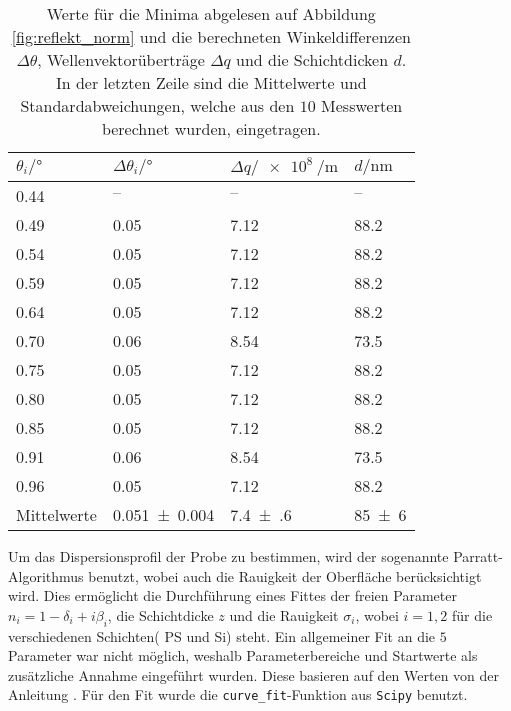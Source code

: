 \begin{table}
    \centering
    \begin{tabular}{@{}llll@{}}
    \toprule
     $\theta_i/ \si{\degree}$&$\Delta \theta_i / \si{\degree}$&$\Delta q / \SI{e8}{\per\metre} $&$d / \si{\nano\metre} $  \\ \midrule
     \num{0.44} &   $– $           &$– $   & $– $  \\
     \num{0.49} &\num{0.05 }   &\num{7.12}       & \num{88.2}  \\
     \num{0.54} &\num{0.05  }   &\num{7.12}      & \num{88.2} \\
     \num{0.59} &\num{0.05  }   &\num{7.12}      & \num{88.2} \\
     \num{0.64} &\num{0.05  }   &\num{7.12}      & \num{88.2} \\
     \num{0.70} &\num{0.06  }   &\num{8.54}      & \num{73.5} \\
     \num{0.75} &\num{0.05  }   &\num{7.12}      & \num{88.2} \\
     \num{0.80} &\num{0.05  }   &\num{7.12}      & \num{88.2} \\
     \num{0.85} &\num{0.05  }   &\num{7.12}      & \num{88.2} \\
     \num{0.91} &\num{0.06  }   &\num{8.54}      & \num{73.5} \\
     \num{0.96} &\num{0.05  }   &\num{7.12}      & \num{88.2} \\ \midrule
      Mittelwerte    &\num{0.051(4)} &\num{7.4(6)}  & \num{85(6)} \\ \bottomrule
    \end{tabular}
    \caption{Werte für die Minima abgelesen auf Abbildung \ref{fig:reflekt_norm} und die berechneten Winkeldifferenzen $\Delta \theta$, Wellenvektorüberträge $\Delta q$ und die Schichtdicken $d$. In der letzten Zeile sind die Mittelwerte und Standardabweichungen, welche aus den $10$ Messwerten berechnet wurden, eingetragen.}
    \label{tab:minima}
\end{table} 
Um das Dispersionsprofil der Probe zu bestimmen, wird der sogenannte Parratt-Algorithmus benutzt, wobei auch die Rauigkeit der Oberfläche berücksichtigt wird. 
Dies ermöglicht die Durchführung eines Fittes der freien Parameter $n_i = 1 -\delta_i +i\beta_i $, die Schichtdicke $z$ und die Rauigkeit $\sigma_i$, wobei $i = 1,2$ für die verschiedenen Schichten( PS und Si) steht. 
Ein allgemeiner Fit an die $5$ Parameter war nicht möglich, weshalb Parameterbereiche und Startwerte als zusätzliche Annahme eingeführt wurden. Diese basieren auf den Werten von der Anleitung \cite{kiessig}. Für den Fit wurde die \texttt{curve\_fit}-Funktion aus \texttt{Scipy} \cite{scipy} benutzt. 
